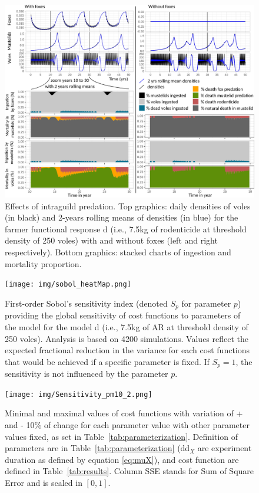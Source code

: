 \documentclass[11pt]{article}
\begin{document}
\begin{figure}
\begin{center}
\includegraphics[width=\linewidth]{img/IGP_Graph.png}
\caption{Effects of intraguild predation. Top graphics: daily densities of voles (in black) and 2-years rolling means of densities (in blue) for the farmer functional response d (i.e., 7.5kg of rodenticide at threshold density of 250 voles) with and without foxes (left and right respectively). Bottom graphics: stacked charts of ingestion and mortality proportion.}
\label{fig:intraguild}
\end{center}
\end{figure}



\begin{figure}
	\begin{center}
		\texttt{[image: img/sobol\_heatMap.png]}
		\caption{First-order Sobol's sensitivity index (denoted $S_p$ for parameter $p$) providing the global sensitivity of cost functions to parameters of the model \citep{Sobol1993} for the model d (i.e., 7.5kg of AR at threshold density of 250 voles). Analysis is based on 4200 simulations. Values reflect the expected fractional reduction in the variance for each cost functions that would be achieved if a specific parameter is fixed. If $S_p = 1$, the sensitivity is not influenced by the parameter $p$.}
		\label{fig:sobol_sensitivity}
	\end{center}
\end{figure}

\begin{figure}
	\begin{center}
		\texttt{[image: img/Sensitivity\_pm10\_2.png]}
		\caption{Minimal and maximal values of cost functions with variation of + and - 10\% of change for each parameter value with other parameter values fixed, as set in Table~\ref{tab:parameterization}. Definition of parameters are in Table~\ref{tab:parameterization} (dd$_X$ are experiment duration as defined by equation \ref{eq:muX}), and cost function are defined in Table~\ref{tab:results}. Column SSE stands for Sum of Square Error and is scaled in $[0,1]$.}
		\label{fig:sensitivity}
	\end{center}
\end{figure}
\end{document}
